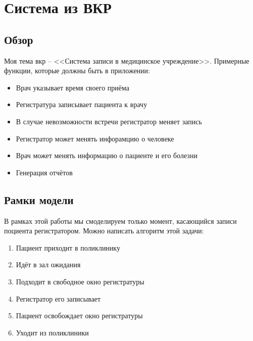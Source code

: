\documentclass[a4paper, article]{article}
\begin{document}
    \pagebreak

    \setcounter{page}{2}

    \tableofcontents

    \pagebreak

    \section{Система из ВКР}

    \subsection{Обзор}

    Моя тема вкр -- <<Система записи в медицинское учреждение>>. Примерные функции, которые должны быть в приложении:

    \vspace{-1em}
    \begin{itemize}
        \setlength\itemsep{0em}

        \item Врач указывает время своего приёма
        \item Регистратура записывает пациента к врачу
        \item В случае невозможности встречи регистратор меняет запись
        \item Регистратор может менять инфорамцию о человеке
        \item Врач может менять информацию о пациенте и его болезни
        \item Генерация отчётов
    \end{itemize}

    \subsection{Рамки модели}

    В рамках этой работы мы смоделируем только момент, касающийся записи поциента регистратором. Можно написать алгоритм этой задачи:

    \vspace{-1em}
    \begin{enumerate}
        \setlength\itemsep{0em}

        \item Пациент приходит в поликлинику
        \item Идёт в зал ожидания
        \item Подходит в свободное окно регистратуры
        \item Регистратор его записывает
        \item Пациент освобождает окно регистратуры
        \item Уходит из поликлиники
    \end{enumerate}
\end{document}
